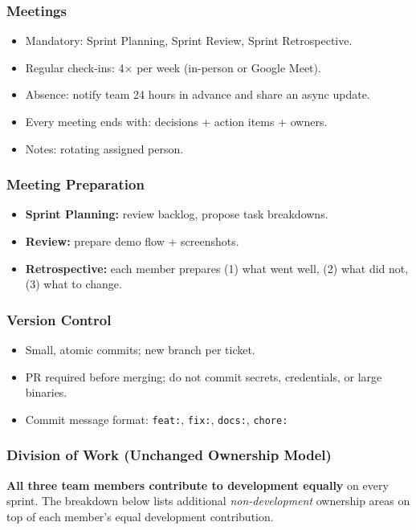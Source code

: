 \documentclass[11pt, legalpaper]{article}
\begin{document}
\subsubsection*{Meetings}
\begin{itemize}
  \item Mandatory: Sprint Planning, Sprint Review, Sprint Retrospective.
  \item Regular check-ins: 4$\times$ per week (in-person or Google Meet).
  \item Absence: notify team 24 hours in advance and share an async update.
  \item Every meeting ends with: decisions + action items + owners.
  \item Notes: rotating assigned person.
\end{itemize}

\subsubsection*{Meeting Preparation}
\begin{itemize}
  \item \textbf{Sprint Planning:} review backlog, propose task breakdowns.
  \item \textbf{Review:} prepare demo flow + screenshots.
  \item \textbf{Retrospective:} each member prepares (1) what went well,
        (2) what did not, (3) what to change.
\end{itemize}

\subsubsection*{Version Control}
\begin{itemize}
  \item Small, atomic commits; new branch per ticket.
  \item PR required before merging; do not commit secrets, credentials, or large binaries.
  \item Commit message format: \texttt{feat:}, \texttt{fix:}, \texttt{docs:}, \texttt{chore:}
\end{itemize}

\subsubsection*{Division of Work (Unchanged Ownership Model)}

\noindent\textbf{All three team members contribute to development equally}
on every sprint. The breakdown below lists additional \emph{non-development}
ownership areas on top of each member's equal development contribution.
\end{document}

